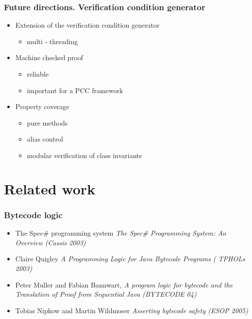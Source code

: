 \documentclass{beamer}
\begin{document}
\begin{frame}\frametitle{Future directions. Verification condition generator }
         \begin{itemize}	   
	    \item Extension of the verification condition generator 
                 \begin{itemize}
	             \item multi - threading
		  \end{itemize}
           \item Machine checked proof
                 \begin{itemize}
	             \item reliable
		       \item important for a PCC framework
		  \end{itemize}
         
    \item Property coverage  
	          \begin{itemize}
	                \item pure methods 
			  \item alias control
			  \item modular verification of class invariants
			    
		   \end{itemize}  
 \end{itemize}  
\end{frame}




\section{Related work}

\begin{frame}[shrink]\frametitle{Bytecode logic}
 \begin{itemize}
    
    
     \item  The Spec\# programming system \textit{The Spec\# Programming System: An Overview (Cassis 2003)} 
      
     \item Claire Quigley \textit{A Programming Logic for Java Bytecode Programs ( TPHOLs 2003)} 

      \item Peter Muller and Fabian Bannwart, \textit{A program logic for bytecode and the Translation of Proof from Sequential Java (BYTECODE 04)}
 
      \item Tobias Nipkow and Martin Wildmoser \textit{Asserting bytecode safety (ESOP 2005)}

\end{itemize}
\end{frame}
\end{document}
